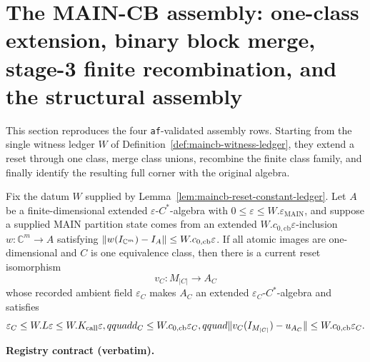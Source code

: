 \section{The MAIN-CB assembly: one-class extension, binary block merge, stage-3 finite recombination, and the structural assembly}\label{sec:maincb-assembly}
This section reproduces the four \texttt{af}-validated assembly rows.  Starting from the single witness ledger $W$ of Definition~\ref{def:maincb-witness-ledger}, they extend a reset
through one class, merge class unions, recombine the finite class family, and finally identify the resulting full corner with the original algebra.
\begin{lemma}\label{lem:maincb-one-class-extension}
Fix the datum $W$ supplied by Lemma~\ref{lem:maincb-reset-constant-ledger}.  Let $A$ be a
finite-dimensional extended $\varepsilon$-$C^*$-algebra with
$0\le\varepsilon\le W.\varepsilon_{\mathrm{MAIN}}$, and suppose a supplied MAIN partition
state comes from an extended $W.c_{0,\mathrm{cb}}\varepsilon$-inclusion
$w:\mathbb C^m\to A$ satisfying
$\lVert w(I_{\mathbb C^m})-I_A\rVert\le W.c_{0,\mathrm{cb}}\varepsilon$.  If all atomic images
are one-dimensional and $C$ is one equivalence class, then there is a current reset
isomorphism
\[
  v_C:M_{|C|}\longrightarrow A_C
\]
whose recorded ambient field $\varepsilon_C$ makes $A_C$ an extended
$\varepsilon_C$-$C^*$-algebra and satisfies
\[
 \varepsilon_C\le W.L\varepsilon\le W.K_{\mathrm{call}}\varepsilon,qquad
 d_C\le W.c_{0,\mathrm{cb}}\varepsilon_C,qquad
 \lVert v_C(I_{M_{|C|}})-u_{A_C}\rVert\le W.c_{0,\mathrm{cb}}\varepsilon_C.
\]
\end{lemma}
\noindent\textbf{Registry contract (verbatim).}
